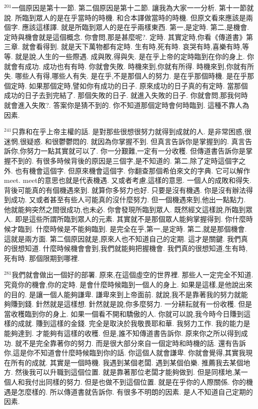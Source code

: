 \documentclass{book}
\begin{document}
$^{201}$一個原因是第十一節.
第二個原因是第十二節.
讓我為大家一一分析.
第十一節就說.
所臨到眾人的是在乎當時的時機.
和合本譯做當時的時機.
但原文看來應該是兩個字.
應該這樣譯.
就是所臨到眾人的是在乎兩樣東西.
第一,是定時.
第二,是機會.
定時與機會就是這個概念.
你會問,那是甚麼呢?.
定時.
其實定時,你看《傳道書》第三章.
就會看得到.
就是天下萬物都有定時.
生有時,死有時.
哀哭有時,喜樂有時,等等.
就是說,人生的一些際遇.
成與敗,得與失.
是在乎上帝的定時臨到在你的身上.
你就會有成功.
成功也有有時.
你就會失敗.
時機來到,你就有所得.
時機來到,你就有所失.
哪些人有得,哪些人有失.
是在乎,不是那個人的努力.
是在乎那個時機.
是在乎那個定時.
如果那個定時,譬如你有成功的日子.
原來成功的日子真的有定時.
當那個成功的日子去到完結了.
那個失敗的日子.
就進入失敗的日子.
你就會問,那我何時就會進入失敗?.
答案你是猜不到的.
你不知道那個定時會何時臨到.
這種不靠人為因素.

$^{241}$只靠和在乎上帝主權的話.
是對那些很想很努力就得到成就的人.
是非常困惑,很迷惘,很疑惑.
和很鬱鬱悶的.
就因為你掌握不到.
但真言告訴你是掌握到的.
真言告訴你,你努力一點其實就可以了.
你一分艱難,一定有一分收穫.
但傳道書告訴你是掌握不到的.
有很多時候背後的原因是三個字,是不知道的.
第二,除了定時這個字之外.
也有機會這個字.
但原來機會這個字.
你翻查那個希伯來文的字典.
它可以解作meet.
meet的意思也就是代表機遇.
又或者考慮,這樣的意思.
一個人的成敗和得失.
背後可能真的有個機遇來到.
就算你多努力也好.
只要是沒有機遇.
你是沒有辦法得到成功.
又或者甚至有些人可能真的沒什麼努力.
但一個機遇來到,他出一點點力.
他就能夠突然之間很成功,也未必.
你會發現所臨到眾人.
既然經文這樣說,所臨到眾人.
即是這些所謂所臨到眾人的元素.
其實就不是那個眾人能夠掌握得到.
你什麼時候才臨到.
什麼時候是不能夠臨到.
是完全在乎,第一,是定時.
第二,就是那個機會.
這就是兩方面.
第二個原因就是,原來人也不知道自己的定期.
這才是關鍵.
我們真的很想知道.
什麼時候機會會到,我們就能夠把握機會.
我們真的很想知道,生有時,死有時.
那個限期到哪裡.

$^{281}$我們就會做出一個好的部署.
原來,在這個虛空的世界裡.
那些人一定完全不知道.
究竟你的機會,你的定時.
是會什麼時候臨到一個人的身上.
如果是這樣,是他說出來的目的.
是讓一個人能夠謙卑.
謙卑來到上帝面前.
就說,我不是靠著我的努力就能夠賺到錢.
針然就是這樣想.
針然就是說,你多麼努力.
一分耕耘就有一份收穫.
但是當收穫臨到你的身上.
如果一個看不開和驕傲的人.
你就可以說,我今時今日賺到這樣的成就.
賺到這樣的金錢.
完全是取決於我敬畏耶和華.
我努力工作.
我的能力是能夠達到.
才能夠有這樣的收穫.
但是,誰不知傳道書告訴你.
原來你之所以得到成功.
就不是完全靠著你的努力.
而是很大部分來自一個定時和時機的話.
還有告訴你,這是你不知道會什麼時候臨到你的話.
你這個人就會謙卑.
你就會覺得,其實我現在所有的成就.
其實是一個時機.
我遇到某個老闆.
遇到某個伯樂.
推薦我去某個地方.
然後我可以升職到這個位置.
就是靠著那位老闆才能夠做到.
但是同樣地,某一個人和我付出同樣的努力.
但是也做不到這個位置.
就是在乎你的人際關係.
你的機遇是怎麼樣的.
所以傳道書就告訴你.
有很多不明朗的因素.
是人不知道自己定期的因素.
\end{document}
